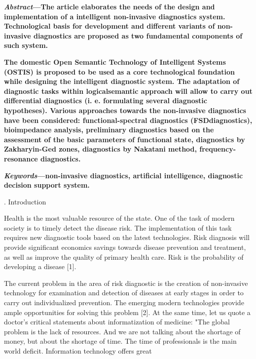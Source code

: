 \documentclass[a4paper]{article}
\newcommand{\RomanNumeralCaps}[1]
    {\MakeUppercase{\romannumeral #1}}
\begin{document}
\begin{multicols}{2}
\fontsize{10}{13}\selectfont
 \par \textbf{\textit{Abstract}—The article elaborates the needs of the design
and implementation of a intelligent non-invasive diagnostics
system. Technological basis for development and different
variants of non-invasive diagnostics are proposed as two
fundamental components of such system.}
\par \textbf{The domestic Open Semantic Technology of Intelligent
Systems (OSTIS) is proposed to be used as a core technological foundation while designing the intelligent diagnostic
system. The adaptation of diagnostic tasks within logicalsemantic approach will allow to carry out differential
diagnostics (i. e. formulating several diagnostic hypotheses).
Various approaches towards the non-invasive diagnostics
have been considered: functional-spectral diagnostics (FSDdiagnostics), bioimpedance analysis, preliminary diagnostics based on the assessment of the basic parameters
of functional state, diagnostics by Zakharyin-Ged zones,
diagnostics by Nakatani method, frequency-resonance diagnostics.
}
\par \textbf{\textit{Keywords}—non-invasive diagnostics, artificial intelligence, diagnostic decision support system.}
\begin{center}
    \RomanNumeralCaps{1}. Introduction
\end{center}
\par Health is the most valuable resource of the state. One
of the task of modern society is to timely detect the
disease risk. The implementation of this task requires
new diagnostic tools based on the latest technologies.
Risk diagnosis will provide significant economics savings
towards disease prevention and treatment, as well as
improve the quality of primary health care. Risk is the
probability of developing a disease [1].
\par The current problem in the area of risk diagnostic is
the creation of non-invasive technology for examination
and detection of diseases at early stages in order to carry
out individualized prevention. The emerging modern
technologies provide ample opportunities for solving this
problem [2]. At the same time, let us quote a doctor’s
critical statements about informatization of medicine:
"The global problem is the lack of resources. And we
are not talking about the shortage of money, but about
the shortage of time. The time of professionals is the
main world deficit. Information technology offers great

\end{multicols}
\end{document}
